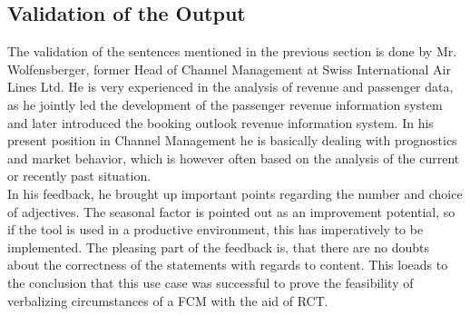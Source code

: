 \documentclass[conference]{IEEEtran}
\begin{document}
\subsection{Validation of the Output}
The validation of the sentences mentioned in the previous section is done by Mr. Wolfensberger, former Head of Channel Management at Swiss International Air Lines Ltd. He is very experienced in the analysis of revenue and passenger data, as he jointly led the development of the passenger revenue information system and later introduced the booking outlook revenue information system. In his present position in Channel Management he is basically dealing with prognostics and market behavior, which is however often based on the analysis of the current or recently past situation.\\
In his feedback, he brought up important points regarding the number and choice of adjectives. The seasonal factor is pointed out as an improvement potential, so if the tool is used in a productive environment, this has imperatively to be implemented. The pleasing part of the feedback is, that there are no doubts about the correctness of the statements with regards to content. This loeads to the conclusion that this use case was successful to prove the feasibility of verbalizing circumstances of a FCM with the aid of RCT.
\end{document}
